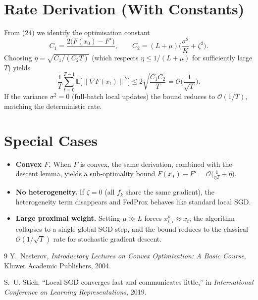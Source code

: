 \documentclass{article}
\newcommand{\EE}{\mathbb{E}}
\newcommand{\norm}[1]{\left\|#1\right\|}
\begin{document}
\section*{Rate Derivation (With Constants)}
From (24) we identify the optimisation constant
\[
C_{1}=\frac{2\big(F(x_0)-F^{\star}\big)}{\,},
\qquad
C_{2}=(L+\mu)\Big(\frac{\sigma^{2}}{K}+ \zeta^{2}\Big).
\]
Choosing $\eta=\sqrt{C_{1}/(C_{2}T)}$ (which respects $\eta\le1/(L+\mu)$ for
sufficiently large $T$) yields
\[
\frac1T\sum_{t=0}^{T-1}\EE\!\big[\norm{\nabla F(x_t)}^{2}\big]
\le 2\sqrt{\frac{C_{1}C_{2}}{T}}
= \mathcal{O}\!\Big(\frac{1}{\sqrt{T}}\Big).
\]
If the variance $\sigma^{2}=0$ (full‑batch local updates) the bound reduces
to $\mathcal{O}(1/T)$, matching the deterministic rate.

\section*{Special Cases}
\begin{itemize}
\item \textbf{Convex $F$.}  When $F$ is convex, the same derivation,
  combined with the descent lemma, yields a sub‑optimality bound
  $F(x_T)-F^{\star}= \mathcal{O}\!\big(\frac{1}{\eta T}+\eta\big)$.
\item \textbf{No heterogeneity.}  If $\zeta=0$ (all $f_k$ share the same
  gradient), the heterogeneity term disappears and FedProx behaves like
  standard local SGD.
\item \textbf{Large proximal weight.}  Setting $\mu\gg L$ forces
  $x_{t,i}^{k}\approx x_t$; the algorithm collapses to a single global SGD
  step, and the bound reduces to the classical $\mathcal{O}(1/\sqrt{T})$
  rate for stochastic gradient descent.
\end{itemize}

\begin{thebibliography}{9}
Y.~Nesterov, \emph{Introductory Lectures on Convex Optimization: A Basic
  Course}, Kluwer Academic Publishers, 2004.

S.~U. Stich, ``Local SGD converges fast and communicates little,'' in
  \emph{International Conference on Learning Representations}, 2019.
\end{thebibliography}
\end{document}
